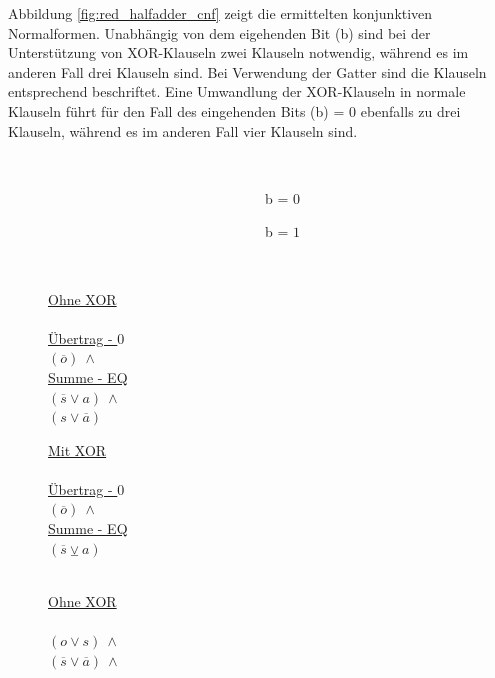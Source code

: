 Abbildung \ref{fig:red_halfadder_cnf} zeigt die ermittelten konjunktiven Normalformen. Unabhängig von dem eigehenden Bit (b) sind bei der Unterstützung
von XOR-Klauseln zwei Klauseln notwendig, während es im anderen Fall drei Klauseln sind. Bei Verwendung der Gatter sind die Klauseln entsprechend beschriftet.
Eine Umwandlung der XOR-Klauseln in normale Klauseln führt für den Fall des eingehenden Bits (b) = 0 ebenfalls zu drei Klauseln, während es im anderen Fall vier
Klauseln sind.
\begin{figure}[!h]
  \centering
  \begin{minipage}[c]{0.3cm}
    ~
  \end{minipage}
  \begin{minipage}[c]{7.1cm}
    ~~~~~~~~~~~~~~~~~~~~~~~~~~~~~~~b = $0$
  \end{minipage}
  \begin{minipage}[c]{7cm}
    ~~~~~~~~~~~~~~~~~~~~~~~~~~~~~~~b = $1$
  \end{minipage}
  \begin{minipage}[l]{0.4cm}
    ~
  \end{minipage}
  \begin{minipage}[l]{3.5cm}
    \underline{Ohne XOR}\\
    ~\\
    \underline{Übertrag - $0$}\\
    $ (\overline{o}) ~ \wedge $\\
    \underline{Summe - EQ}\\
    $ (\overline{s} \vee  a) ~ \wedge $\\
    $ (s \vee \overline{a}) $
  \end{minipage}
  \begin{minipage}[l]{3.5cm}
    \underline{Mit XOR}\\
    ~\\
    \underline{Übertrag - $0$}\\
    $ (\overline{o}) ~ \wedge $\\
    \underline{Summe - EQ}\\
    $ (\overline{s} \veebar a) $\\
    ~
  \end{minipage}
  \begin{minipage}[l]{3.5cm}
    \underline{Ohne XOR}\\
    ~\\
    $ (o \vee  s) ~ \wedge $\\
    $ (\overline{s} \vee  \overline{a}) ~ \wedge $\\

\end{minipage}
\end{figure}
